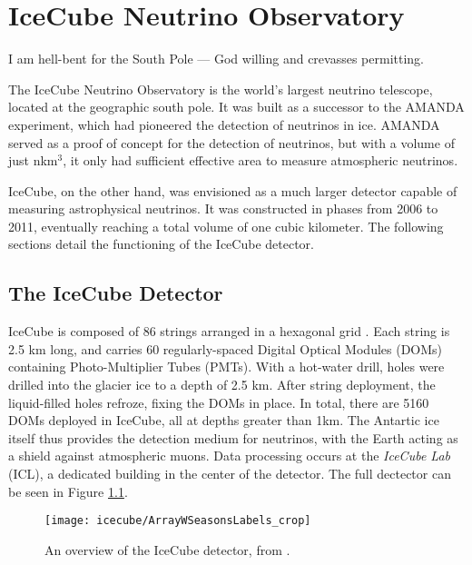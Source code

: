 \setchapterpreamble[u]{\margintoc}
\chapter{IceCube Neutrino Observatory}
\begin{fquote} I am hell-bent for the South Pole — God willing and crevasses permitting.
\end{fquote}
The IceCube Neutrino Observatory is the world's largest neutrino telescope, located at the geographic south pole. It was built as a successor to the AMANDA experiment, which had pioneered the detection of neutrinos in ice. AMANDA served as a proof of concept for the detection of neutrinos, but with a volume of just nkm$^{3}$, it only had sufficient effective area to measure atmospheric neutrinos. 

IceCube, on the other hand, was envisioned as a much larger detector capable of measuring astrophysical neutrinos. It was constructed in phases from 2006 to 2011, eventually reaching a total volume of one cubic kilometer. The following sections detail the functioning of the IceCube detector.

\section{The IceCube Detector}

IceCube is composed of 86 strings arranged in a hexagonal grid . Each string is 2.5 km long, and carries 60 regularly-spaced Digital Optical Modules (DOMs) containing Photo-Multiplier Tubes (PMTs). With a hot-water drill, holes were drilled into the glacier ice to a depth of 2.5 km. After string deployment, the liquid-filled holes refroze, fixing the DOMs in place. In total, there are 5160 DOMs deployed in IceCube, all at depths greater than 1km. The Antartic ice itself thus provides the detection medium for neutrinos, with the Earth acting as a shield against atmospheric muons. Data processing occurs at the \emph{IceCube Lab} (ICL), a dedicated building in the center of the detector. The full dectector can be seen in Figure \ref{fig:ic_detector}.

\begin{figure}
	\centering \texttt{[image: icecube/ArrayWSeasonsLabels\_crop]}
	\caption{An overview of the IceCube detector, from \cite{icecube_detector_17}.}
	\label{fig:ic_detector}
\end{figure}

